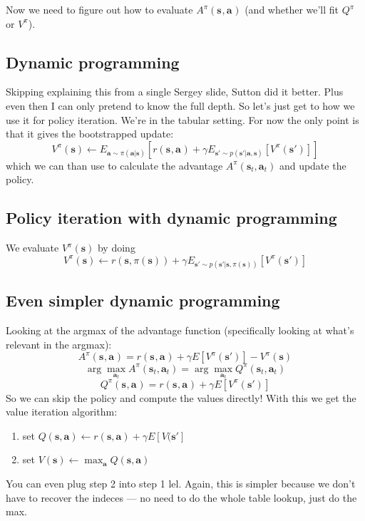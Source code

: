 \documentclass{report}
\newcommand{\argmax}{\arg\!\max}
\begin{document}
Now we need to figure out how to evaluate $A^\pi (\bm{s}_{}, \bm{a}_{}) $ (and whether
we'll fit $Q^\pi$ or $V^\pi$).
\subsection{Dynamic programming}
Skipping explaining this from a single Sergey slide, Sutton did it better.
Plus even then I can only pretend to know the full depth.
So let's just get to how we use it for policy iteration.
We're in the tabular setting.
For now the only point is that it gives the bootstrapped update:
\begin{equation}
V^\pi(\bm{s}) \leftarrow E_{\bm{a} \sim \pi(\bm{a}|\bm{s})} \left[ r(\bm{s}_{}, \bm{a}_{}) + \gamma E_{\bm{s}' \sim p(\bm{s}' |\bm{a},\bm{s}  )} [V^\pi(\bm{s}') ] \right] 
\end{equation}
which we can than use to calculate the advantage $A^\pi (\bm{s}_{t}, \bm{a}_{t})$ and update the policy.

\subsection{Policy iteration with dynamic programming}
We evaluate $V^\pi(\bm{s})$ by doing
\begin{equation}
		V^\pi (\bm{s}) \leftarrow r(\bm{s}, \pi(\bm{s})) + 
		\gamma E_{\bm{s}' \sim p(\bm{s}'| \bm{s}, \pi(\bm{s}))}
				\left[ V^\pi(\bm{s}') \right] 
\end{equation}


\subsection{Even simpler dynamic programming}
Looking at the argmax of the advantage function (specifically looking at 
what's relevant in the argmax):
\begin{equation}
		A^\pi (\bm{s}_{}, \bm{a}_{}) = r(\bm{s}_{}, \bm{a}_{}) + \gamma E \left[ V^\pi(\bm{s}') \right]- V^\pi(\bm{s})  
\end{equation}
\begin{equation}
		\argmax_{\bm{a}_t} A^\pi (\bm{s}_{t}, \bm{a}_{t}) = 
		\argmax_{\bm{a}_t} Q^\pi (\bm{s}_{t}, \bm{a}_{t}) 
\end{equation}
\begin{equation}
		Q^\pi(\bm{s}_{}, \bm{a}_{}) = r (\bm{s}_{}, \bm{a}_{}) + \gamma E \left[ V^\pi(\bm{s}')\right]
\end{equation}
So we can skip the policy and compute the values directly!
With this we get the value  iteration algorithm:
\begin{enumerate}
		\item set $Q(\bm{s}, \bm{a}) \leftarrow r (\bm{s}, \bm{a}) + \gamma E[V(\bm{s}']$
		\item set $V(\bm{s}) \leftarrow \max_{\bm{a}} Q(\bm{s}, \bm{a})$
\end{enumerate}
You can even plug step 2 into step 1 lel.
Again, this is simpler because we don't have to recover the indeces --- no need to do the whole table lookup,
just do the max.
\end{document}
